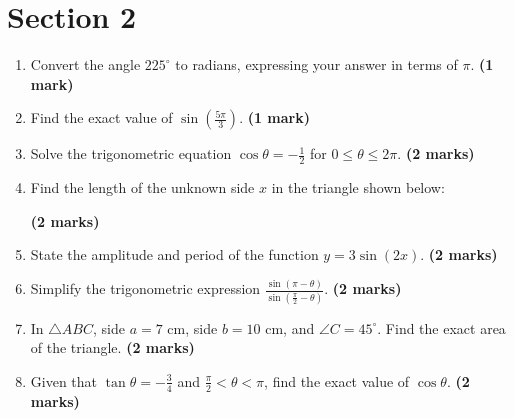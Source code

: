 \documentclass{article}
\begin{document}
\section*{Section 2}
\begin{enumerate}
    
    \item Convert the angle $225^\circ$ to radians, expressing your answer in terms of $\pi$. \hfill \textbf{(1 mark)}
    \vspace{0.5cm}

    \item Find the exact value of $\sin\left(\frac{5\pi}{3}\right)$. \hfill \textbf{(1 mark)}
    \vspace{0.5cm}

    \item Solve the trigonometric equation $\cos \theta = -\frac{1}{2}$ for $0 \le \theta \le 2\pi$. \hfill \textbf{(2 marks)}
    \vspace{0.5cm}

    \item Find the length of the unknown side $x$ in the triangle shown below:
    
     \hfill \textbf{(2 marks)}
    \vspace{0.5cm}

    \item State the amplitude and period of the function $y = 3\sin(2x)$. \hfill \textbf{(2 marks)}
    \vspace{0.5cm}

    \item Simplify the trigonometric expression $\frac{\sin(\pi - \theta)}{\sin(\frac{\pi}{2} - \theta)}$. \hfill \textbf{(2 marks)}
    \vspace{0.5cm}

    \item In $\triangle ABC$, side $a = 7\text{ cm}$, side $b = 10\text{ cm}$, and $\angle C = 45^\circ$. Find the exact area of the triangle. \hfill \textbf{(2 marks)}
    \vspace{0.5cm}

    \item Given that $\tan \theta = -\frac{3}{4}$ and $\frac{\pi}{2} < \theta < \pi$, find the exact value of $\cos \theta$. \hfill \textbf{(2 marks)}
    \vspace{0.5cm}


\end{enumerate}
\end{document}
